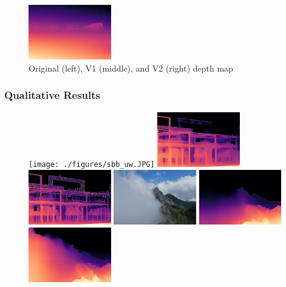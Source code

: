 \documentclass[12pt]{beamer}
\begin{document}
\begin{frame}
\begin{figure}
        \includegraphics[width=0.32\textwidth]{./figures/gl_seeli_v2-small.png}
        \caption{Original (left), V1 (middle), and V2 (right) depth map}
        \label{fig:res_1}
    \end{figure}
\end{frame}

\begin{frame}
    \frametitle{Qualitative Results}
    
    \begin{figure}
        \centering
        \texttt{[image: ./figures/sbb\_uw.JPG]}
        \includegraphics[width=0.32\textwidth]{./figures/sbb_uw_v1-small.png}
        \includegraphics[width=0.32\textwidth]{./figures/sbb_uw_v2-small.png}
        \includegraphics[width=0.32\textwidth]{./figures/luhinterland.JPG}
        \includegraphics[width=0.32\textwidth]{./figures/luhinterland_v1-small.png}
        \includegraphics[width=0.32\textwidth]{./figures/luhinterland_v2-small.png}

\end{figure}
\end{frame}
\end{document}
